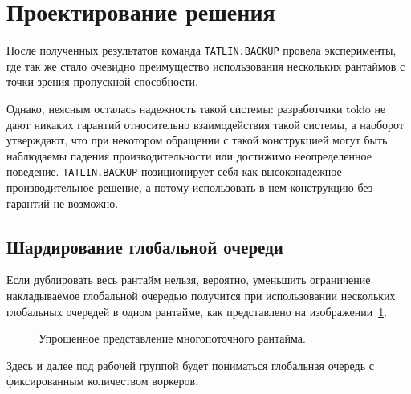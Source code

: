 
\section{Проектирование решения}

После полученных результатов команда \verb|TATLIN.BACKUP| провела эксперименты, где так же стало очевидно преимущество использования нескольких рантаймов с точки зрения пропускной способности.

Однако, неясным осталась надежность такой системы: разработчики tokio не дают никаких гарантий относительно взаимодействия такой системы, а наоборот утверждают, что при некотором обращении с такой конструкцией могут быть наблюдаемы падения производительности или достижимо неопределенное поведение. \verb|TATLIN.BACKUP| позиционирует себя как высоконадежное производительное решение, а потому использовать в нем конструкцию без гарантий не возможно.

\subsection{Шардирование глобальной очереди}

Если дублировать весь рантайм нельзя, вероятно, уменьшить ограничение накладываемое глобальной очередью получится при использовании нескольких глобальных очередей в одном рантайме, как представлено на изображении~\ref{fig:tokio:duplicated_arch}.

\begin{figure}[H]
    \begin{center}
    \end{center}

    \caption{Упрощенное представление многопоточного рантайма.}
    \label{fig:tokio:duplicated_arch}
\end{figure}
Здесь и далее под рабочей группой будет пониматься глобальная очередь с фиксированным количеством воркеров.

